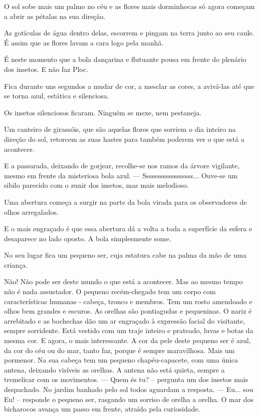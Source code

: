 O sol sobe mais um palmo no céu e as flores mais dorminhocas só agora começam a abrir as pétalas na sua direção.

As gotículas de água dentro delas, escorrem e pingam na terra junto ao seu caule. É assim que as flores lavam a cara logo pela manhã.

É neste momento que a bola dançarina e flutuante pousa em frente do plenário dos insetos. E não faz Ploc.

Fica durante uns segundos a mudar de cor, a mesclar as cores, a avivá-las até que se torna azul, estática e silenciosa.

Os insetos silenciosos ficaram. Ninguém se mexe, nem pestaneja.

Um canteiro de girassóis, que são aquelas flores que sorriem o dia inteiro na direção do sol, retorcem as suas hastes para também poderem ver o que está a acontecer.

E a passarada, deixando de gorjear, recolhe-se nos ramos da árvore vigilante, mesmo em frente da misteriosa bola azul.
\bigbreak
— Ssssssssssssssssss...
\bigbreak
Ouve-se um sibilo parecido com o zunir dos insetos, mas mais melodioso.

Uma abertura começa a surgir na parte da bola virada para os observadores de olhos arregalados.

E o mais engraçado é que essa abertura dá a volta a toda a superfície da esfera e desaparece no lado oposto. A bola simplesmente some.

No seu lugar fica um pequeno ser, cuja estatura cabe na palma da mão de uma criança.

Não! Não pode ser deste mundo o que está a acontecer. Mas ao mesmo tempo não é nada assustador.
\bigbreak
O pequeno recém-chegado tem um corpo com características humanas - cabeça, tronco e membros. Tem um rosto amendoado e olhos bem grandes e escuros. As orelhas são pontiagudas e pequeninas. O nariz é arrebitado e as bochechas dão um ar engraçado à expressão facial do visitante, sempre sorridente. Está vestido com um traje inteiro e prateado, luvas e botas da mesma cor. E agora, o mais interessante. A cor da pele deste pequeno ser é azul, da cor do céu ou do mar, tanto faz, porque é sempre maravilhosa. Mais um pormenor. Na sua cabeça tem um pequeno chapéu-capacete, com uma única antena, deixando visíveis as orelhas. A antena não está quieta, sempre a tremelicar com os movimentos.
\bigbreak
— Quem és tu? – pergunta um dos insetos mais despachado.
\bigbreak
No jardim banhado pelo sol todos aguardam a resposta.
\bigbreak
— Eu... sou Eu! – responde o pequeno ser, rasgando um sorriso de orelha a orelha.
\bigbreak
O mar dos bicharocos avança um passo em frente, atraído pela curiosidade.

